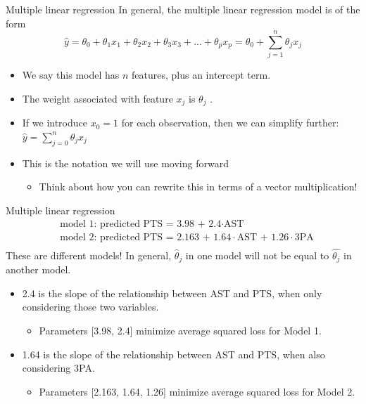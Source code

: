 \documentclass[aspectratio=169]{../latex_main/tntbeamer}  %
\begin{document}
	\begin{frame}{Multiple linear regression}
	    In general, the multiple linear regression model is of the form
        \begin{equation*}
            \hat{y} = \theta_0 + \theta_1x_1 +  \theta_2x_2 + \theta_3x_3 + ... + \theta_px_p = \theta_0 + \sum_{j=1}^n\theta_jx_j
        \end{equation*}
        
        \begin{itemize}
            \item We say this model has $n$ features, plus an intercept term.
            \item The weight associated with feature $x_j$ is $\theta_j$   .
            \item If we introduce $x_0  = 1$  for each observation, then we can simplify further: $\hat{y} = \sum_{j=0}^n \theta_j x_j$
            \item This is the notation we will use moving forward
            \begin{itemize}
                \item Think about how you can rewrite this in terms of a vector multiplication!
            \end{itemize}
        \end{itemize}
	\end{frame}
	
	
	
	\begin{frame}{Multiple linear regression}
        \begin{align*}
            &\text{model 1: predicted PTS = 3.98 + 2.4}\cdot \text{AST}\\
            &\text{model 2: predicted PTS = 2.163 + 1.64}\cdot \text{AST + 1.26}\cdot \text{3PA}\\
        \end{align*}
        These are different models! In general, $\hat{\theta}_j$ in one model will not be equal to $\hat{\theta_j}$ in another model.
        \begin{itemize}
            \item 2.4 is the slope of the relationship between AST and PTS, when only considering those two variables.
            \begin{itemize}
                \item Parameters [3.98, 2.4] minimize average squared loss for Model 1.
            \end{itemize}
            \item 1.64 is the slope of the relationship between AST and PTS, when also considering 3PA.
            \begin{itemize}
                \item Parameters [2.163, 1.64, 1.26] minimize average squared loss for Model 2.
            \end{itemize}
        \end{itemize}

	\end{frame}
	
\end{document}
